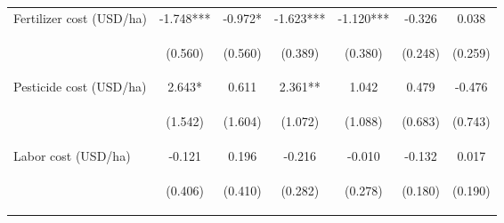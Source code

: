 \begin{center}
\begin{tabular}{lcccccc}
Fertilizer cost (USD/ha) & -1.748*** & -0.972* & -1.623*** & -1.120*** & -0.326 & 0.038 \\
\vspace{4pt} & \begin{footnotesize}(0.560)\end{footnotesize} & \begin{footnotesize}(0.560)\end{footnotesize} & \begin{footnotesize}(0.389)\end{footnotesize} & \begin{footnotesize}(0.380)\end{footnotesize} & \begin{footnotesize}(0.248)\end{footnotesize} & \begin{footnotesize}(0.259)\end{footnotesize} \\
Pesticide cost (USD/ha) & 2.643* & 0.611 & 2.361** & 1.042 & 0.479 & -0.476 \\
\vspace{4pt} & \begin{footnotesize}(1.542)\end{footnotesize} & \begin{footnotesize}(1.604)\end{footnotesize} & \begin{footnotesize}(1.072)\end{footnotesize} & \begin{footnotesize}(1.088)\end{footnotesize} & \begin{footnotesize}(0.683)\end{footnotesize} & \begin{footnotesize}(0.743)\end{footnotesize} \\
Labor cost (USD/ha) & -0.121 & 0.196 & -0.216 & -0.010 & -0.132 & 0.017 \\
\vspace{4pt} & \begin{footnotesize}(0.406)\end{footnotesize} & \begin{footnotesize}(0.410)\end{footnotesize} & \begin{footnotesize}(0.282)\end{footnotesize} & \begin{footnotesize}(0.278)\end{footnotesize} & \begin{footnotesize}(0.180)\end{footnotesize} & \begin{footnotesize}(0.190)\end{footnotesize} \\

\end{tabular}
\end{center}

